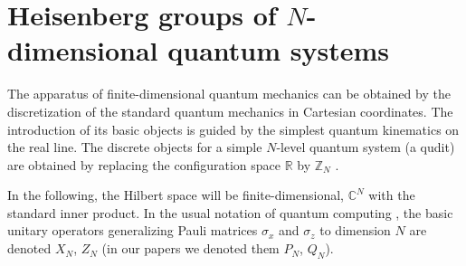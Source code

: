 \documentclass[10pt]{amsart}
\theoremstyle{plain}
\theoremstyle{definition}
\theoremstyle{remark}%
\newcommand{\Z}{\mathbb{Z}}
\newcommand{\R}{\mathbb{R}}
\newcommand{\C}{\mathbb{C}}
\newcommand{\U}{\mathrm{U}}
\begin{document}
\section{Heisenberg groups of $N$-dimensional quantum systems}\label{section_3}


The apparatus of finite-dimensional quantum mechanics can be obtained 
by the discretization of the standard quantum mechanics in Cartesian
coordinates. The introduction of its basic objects is guided by the
simplest quantum kinematics on the real line. 
The discrete objects for a simple $N$-level quantum system (a qudit)
are obtained by replacing the configuration space $\R$ by $\Z_N$  
\cite{Schwinger,StovTolar84,Vourdas,Weyl}.

In the following, the Hilbert space will be finite-dimensional, 
$\C^N$ with the standard inner product. 
In the usual notation of quantum computing \cite{appleby, Appleby11,NielsenChuang}, 
the basic unitary operators generalizing Pauli matrices 
$\sigma_x$ and $\sigma_z$ to dimension $N$ 
are denoted $X_N$, $Z_N$ (in our papers \cite{HPPT02,KorbTolar10,KorbTolar12} we denoted them  $P_N$, $Q_N$). 
\end{document}
